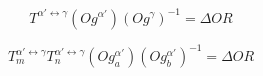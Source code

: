 $$T^{\alpha'\leftrightarrow\gamma}\left(Og^{\alpha'}\right)\left(Og^{\gamma}\right)^{-1} = \Delta OR \label{eq:1}$$

$$T_{m}^{\alpha'\leftrightarrow\gamma}T_{n}^{\alpha'\leftrightarrow\gamma}\left(Og_{a}^{\alpha'}\right)\left(Og_{b}^{\alpha'}\right)^{-1} = \Delta OR \label{eq:2}$$

